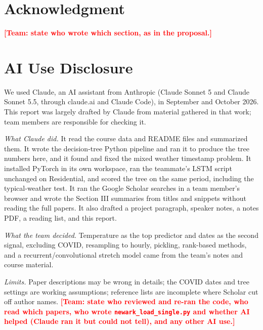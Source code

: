\documentclass[conference]{IEEEtran}
\newcommand{\todo}[1]{\textcolor{red}{\textbf{[Team: #1]}}}
\newcommand{\code}[1]{\texttt{#1}}
\begin{document}
\section*{Acknowledgment}
\todo{state who wrote which section, as in the proposal.}

\section*{AI Use Disclosure}
We used Claude, an AI assistant from Anthropic (Claude Sonnet 5 and Claude Sonnet 5.5, through claude.ai and Claude Code), in September and October 2026. This report was largely drafted by Claude from material gathered in that work; team members are responsible for checking it.

\textit{What Claude did.} It read the course data and README files and summarized them. It wrote the decision-tree Python pipeline and ran it to produce the tree numbers here, and it found and fixed the mixed weather timestamp problem. It installed PyTorch in its own workspace, ran the teammate's LSTM script unchanged on Residential, and scored the tree on the same period, including the typical-weather test. It ran the Google Scholar searches in a team member's browser and wrote the Section III summaries from titles and snippets without reading the full papers. It also drafted a project paragraph, speaker notes, a notes PDF, a reading list, and this report.

\textit{What the team decided.} Temperature as the top predictor and dates as the second signal, excluding COVID, resampling to hourly, pickling, rank-based methods, and a recurrent/convolutional stretch model came from the team's notes and course material.

\textit{Limits.} Paper descriptions may be wrong in details; the COVID dates and tree settings are working assumptions; reference lists are incomplete where Scholar cut off author names. \todo{state who reviewed and re-ran the code, who read which papers, who wrote \code{newark\_load\_single.py} and whether AI helped (Claude ran it but could not tell), and any other AI use.}
\end{document}
